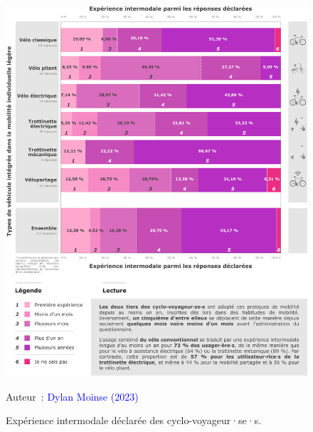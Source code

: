 \begin{refsegment}
    \begin{figure}[h!]\vspace*{4pt}
        \caption{Expérience intermodale déclarée des cyclo-voyageur·se·s.}
        \label{fig-chap4:experience-intermodale}
        \centerline{\includegraphics[width=1\columnwidth]{src/Figures/Chap-4/FR_Experience_intermodale.pdf}}
        \vspace{5pt}
        \begin{flushright}\scriptsize{
        Auteur~: \textcolor{blue}{Dylan Moinse (2023)}
        }\end{flushright}
    \end{figure}


\end{refsegment}
